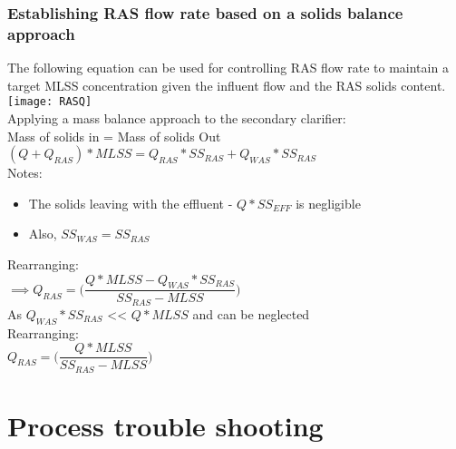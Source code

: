 		\subsubsection{Establishing RAS flow rate based on a solids balance approach}
%
The following equation can be used for controlling RAS flow rate to maintain a target MLSS concentration given the influent flow and the RAS solids content.\\
\vspace{0.3cm}
\texttt{[image: RASQ]}\\
Applying a mass balance approach to the secondary clarifier:\\
Mass of solids in = Mass of solids Out\\
$(Q + Q_{RAS})* MLSS = Q_{RAS} *SS_{RAS} + Q_{WAS} *SS_{RAS}$\\
Notes:
\begin{itemize}
\item The solids leaving with the effluent - $Q*SS_{EFF}$ is negligible\\
\item Also, $SS_{WAS}=SS_{RAS}$ \\
\end{itemize}
Rearranging:\\
$ \implies Q_{RAS} = \Bigg(\dfrac{Q*MLSS - Q_{WAS} * SS_{RAS}}{SS_{RAS} - MLSS}\Bigg)$\\
As $Q_{WAS}*SS_{RAS}$ << $Q*MLSS$ and can be neglected\\
Rearranging:\\
$Q_{RAS} = \Bigg(\dfrac{Q*MLSS}{SS_{RAS} - MLSS}\Bigg)$ 


		\section{Process trouble shooting}

